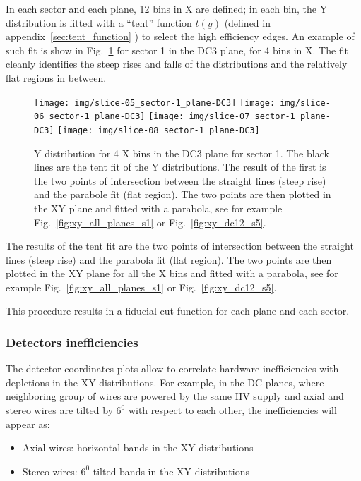 In each sector and each plane, 12 bins in X are defined; in each bin, the Y distribution
is fitted with a ``tent'' function $t(y)$ (defined in appendix~\ref{sec:tent_function} ) to select the high efficiency edges.
An example of such fit is show in Fig.~\ref{fig:y_slices_s1} for sector 1 in the DC3 plane, for 4 bins in X\@.
The fit cleanly identifies the steep rises and falls of the distributions and the relatively flat regions in between.

\clearpage\newpage

\begin{figure}[h]
    \centering
    \texttt{[image: img/slice-05\_sector-1\_plane-DC3]}
    \texttt{[image: img/slice-06\_sector-1\_plane-DC3]}
    \texttt{[image: img/slice-07\_sector-1\_plane-DC3]}
    \texttt{[image: img/slice-08\_sector-1\_plane-DC3]}
    \caption{Y distribution for 4 X bins in the DC3 plane for sector 1. The black lines are the
    tent fit of the Y distributions. The result of the first is the two points of intersection between the
    straight lines (steep rise) and the parabole fit (flat region). The two points are then plotted in the XY
    plane and fitted with a parabola, see for example Fig.~\ref{fig:xy_all_planes_s1} or Fig.~\ref{fig:xy_dc12_s5}.}
    \label{fig:y_slices_s1}
\end{figure}

The results of the tent fit are the two points of intersection between the straight lines (steep rise)
and the parabola fit (flat region). The two points are then plotted in the XY plane for all the X bins
and fitted with a parabola, see for example  Fig.~\ref{fig:xy_all_planes_s1} or Fig.~\ref{fig:xy_dc12_s5}.

This procedure results in a fiducial cut function for each plane and each sector.

\clearpage\newpage

\subsubsection{Detectors inefficiencies}
The detector coordinates plots allow to correlate hardware inefficiencies with depletions in the XY distributions.
For example, in the DC planes, where neighboring group of wires are powered by the same HV supply and
axial and stereo wires are tilted by $6^0$ with respect to each other, the inefficiencies
will appear as:

\begin{itemize}
    \item Axial wires: horizontal bands in the XY distributions
    \item Stereo wires: $6^0$ tilted bands in the XY distributions
\end{itemize}

